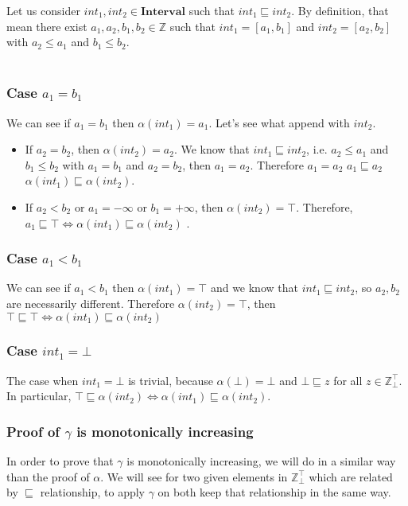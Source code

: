 \documentclass{article}
\newcommand{\interval}{\textbf{Interval}}
\newcommand{\ztop}{\mathbb{Z}_{\bot}^{\top}}
\newcommand{\zta}{\mathbb{Z}}
\begin{document}
Let us consider $int_1, int_2 \in \interval$ such that $int_1 \sqsubseteq int_2$. By definition, that mean there exist $a_1,a_2,b_1,b_2 \in \zta$ such that $int_1 = \left[ a_1, b_1\right]$ and $int_2 = \left[ a_2, b_2\right]$ with $a_2 \leq a_1$ and $b_1 \leq b_2$.\\\\
 
\subsubsection*{Case $a_1 = b_1$}

We can see if $a_1 = b_1$ then $\alpha (int_1) = a_1$. Let's see what append with $int_2$.
\begin{itemize}
    \item If $a_2 = b_2$, then $\alpha(int_2) = a_2$. We know that $int_1 \sqsubseteq int_2$, i.e. $a_2 \leq a_1$ and $b_1 \leq b_2$ with $a_1 = b_1$ and $a_2=b_2$, then $a_1 = a_2$. Therefore $a_1 = a_2$ \iff $a_1 \sqsubseteq a_2$ \iff $\alpha(int_1) \sqsubseteq \alpha(int_2)$.
    \item If $a_2 < b_2$ or $a_1 = -\infty$ or $b_1 = +\infty$, then $\alpha(int_2) = \top$. Therefore, $a_1 \sqsubseteq \top \iff \alpha(int_1) \sqsubseteq \alpha(int_2)$ .
\end{itemize}

\subsubsection*{Case $a_1 < b_1$}

We can see if $a_1 < b_1$ then $\alpha (int_1) = \top$ and we know that $int_1 \sqsubseteq int_2$, so $a_2, b_2$ are necessarily different. Therefore $\alpha (int_2) = \top$, then $\top \sqsubseteq \top \iff \alpha(int_1) \sqsubseteq \alpha(int_2)$

\subsubsection*{Case $int_1 = \bot$}

The case when $int_1 = \bot$ is trivial, because $\alpha(\bot) = \bot$ and  $\bot \sqsubseteq z$ for all $z \in \ztop$. In particular, $\top \sqsubseteq \alpha(int_2) \iff \alpha(int_1) \sqsubseteq \alpha(int_2)$.

\subsubsection*{Proof of $\gamma$ is monotonically increasing}
In order to prove that $\gamma$ is monotonically increasing, we will do in a similar way than the proof of $\alpha$. We will see for two given elements in $\ztop$ which are related by $\sqsubseteq$ relationship, to apply $\gamma$ on both keep that relationship in the same way. \\
\end{document}
